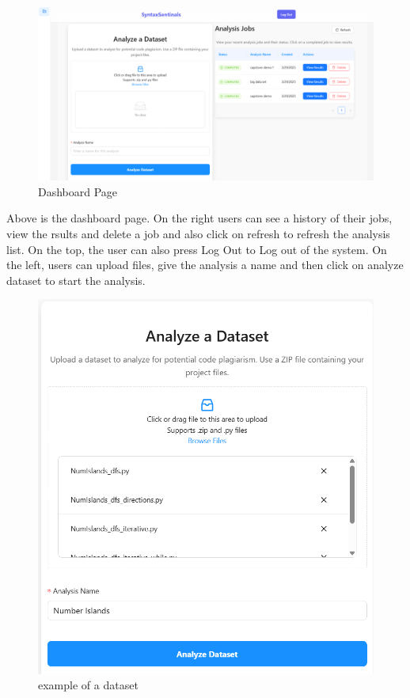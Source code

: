 \documentclass{article}
\begin{document}
\begin{figure}[H]
    \centering
    \includegraphics[width=\textwidth]{DashBoard.png}
    \caption{Dashboard Page}
    \label{fig:Dashboard}
  \end{figure}

Above is the dashboard page. On the right users can see a history of their jobs, view the rsults and delete a job and also click on refresh to refresh the analysis list.
On the top, the user can also press Log Out to Log out of the system.
On the left, users can upload files, give the analysis a name and then click on analyze dataset to start the analysis.

\begin{figure}[H]
    \centering
    \includegraphics[width=\textwidth]{Analyze.png}
    \caption{example of a dataset}
    \label{fig:Analyze dataset}
  \end{figure}
\end{document}
